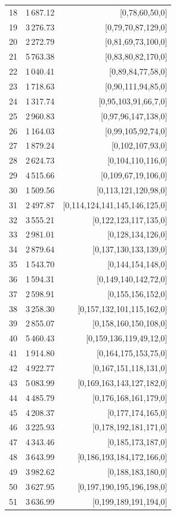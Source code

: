 \documentclass[a4paper,11pt]{article}
\begin{document}
\begin{longtable}{lrr}
18 & 1\,687.12 &[0,78,60,50,0]\\
19 & 3\,276.73 &[0,79,70,87,129,0]\\
20 & 2\,272.79 &[0,81,69,73,100,0]\\
21 & 5\,763.38 &[0,83,80,82,170,0]\\
22 & 1\,040.41 &[0,89,84,77,58,0]\\
23 & 1\,718.63 &[0,90,111,94,85,0]\\
24 & 1\,317.74 &[0,95,103,91,66,7,0]\\
25 & 2\,960.83 &[0,97,96,147,138,0]\\
26 & 1\,164.03 &[0,99,105,92,74,0]\\
27 & 1\,879.24 &[0,102,107,93,0]\\
28 & 2\,624.73 &[0,104,110,116,0]\\
29 & 4\,515.66 &[0,109,67,19,106,0]\\
30 & 1\,509.56 &[0,113,121,120,98,0]\\
31 & 2\,497.87 &[0,114,124,141,145,146,125,0]\\
32 & 3\,555.21 &[0,122,123,117,135,0]\\
33 & 2\,981.01 &[0,128,134,126,0]\\
34 & 2\,879.64 &[0,137,130,133,139,0]\\
35 & 1\,543.70 &[0,144,154,148,0]\\
36 & 1\,594.31 &[0,149,140,142,72,0]\\
37 & 2\,598.91 &[0,155,156,152,0]\\
38 & 3\,258.30 &[0,157,132,101,115,162,0]\\
39 & 2\,855.07 &[0,158,160,150,108,0]\\
40 & 5\,460.43 &[0,159,136,119,49,12,0]\\
41 & 1\,914.80 &[0,164,175,153,75,0]\\
42 & 4\,922.77 &[0,167,151,118,131,0]\\
43 & 5\,083.99 &[0,169,163,143,127,182,0]\\
44 & 4\,485.79 &[0,176,168,161,179,0]\\
45 & 4\,208.37 &[0,177,174,165,0]\\
46 & 3\,225.93 &[0,178,192,181,171,0]\\
47 & 4\,343.46 &[0,185,173,187,0]\\
48 & 3\,643.99 &[0,186,193,184,172,166,0]\\
49 & 3\,982.62 &[0,188,183,180,0]\\
50 & 3\,627.95 &[0,197,190,195,196,198,0]\\
51 & 3\,636.99 &[0,199,189,191,194,0]\\
\end{longtable}
\end{document}
